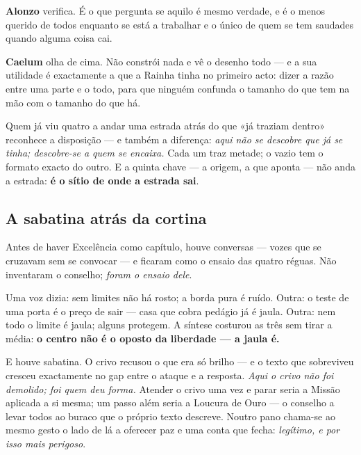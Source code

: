 \documentclass[livro.tex]{subfiles}
\begin{document}
\medskip

\textbf{Alonzo} verifica. É o que pergunta se aquilo é mesmo verdade, e é o menos querido de todos
enquanto se está a trabalhar e o único de quem se tem saudades quando alguma coisa cai.

\medskip

\textbf{Caelum} olha de cima. Não constrói nada e vê o desenho todo --- e a sua utilidade é
exactamente a que a Rainha tinha no primeiro acto: dizer a razão entre uma parte e o todo, para que
ninguém confunda o tamanho do que tem na mão com o tamanho do que há.

\medskip

Quem já viu quatro a andar uma estrada atrás do que «já traziam dentro» reconhece a disposição ---
e também a diferença: \emph{aqui não se descobre que já se tinha; descobre-se a quem se encaixa.}
Cada um traz metade; o vazio tem o formato exacto do outro. E a quinta chave --- a origem, a que
aponta --- não anda a estrada: \textbf{é o sítio de onde a estrada sai}.

\subsection*{A sabatina atrás da cortina}

Antes de haver Excelência como capítulo, houve conversas --- vozes que se cruzavam sem se
convocar --- e ficaram como o ensaio das quatro réguas. Não inventaram o conselho;
\emph{foram o ensaio dele}.

\medskip

Uma voz dizia: sem limites não há rosto; a borda pura é ruído. Outra: o teste de uma porta é o
preço de sair --- casa que cobra pedágio já é jaula. Outra: nem todo o limite é jaula; alguns
protegem. A síntese costurou as três sem tirar a média: \textbf{o centro não é o oposto da
liberdade --- a jaula é.}

\medskip

E houve sabatina. O crivo recusou o que era só brilho --- e o texto que sobreviveu cresceu
exactamente no gap entre o ataque e a resposta. \emph{Aqui o crivo não foi demolido; foi quem
deu forma.} Atender o crivo uma vez e parar seria a Missão aplicada a si mesma; um passo além
seria a Loucura de Ouro --- o conselho a levar todos ao buraco que o próprio texto descreve.
Noutro pano chama-se ao mesmo gesto o lado de lá a oferecer paz e uma conta que fecha:
\emph{legítimo, e por isso mais perigoso}.

\medskip
\end{document}
